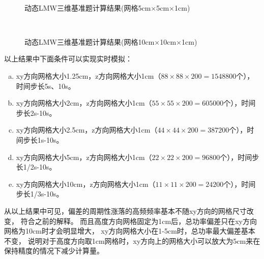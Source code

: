 \begin{figure}[H]
\centering
{}
\\[1cm]
\caption{动态LMW三维基准题计算结果(网格5cm$\times$5cm$\times$1cm)\label{fig:testresult.lwm.5z1}}
\end{figure}


\begin{figure}[H]
\centering
{}
\\[1cm]
\caption{动态LMW三维基准题计算结果(网格10cm$\times$10cm$\times$1cm)\label{fig:testresult.lwm.10z1}}
\end{figure}


\clearpage

以上结果中下面条件可以实现实时模拟：
\begin{enumerate}[a)]
\item xy方向网格大小1.25cm，z方向网格大小1cm（$88\times88\times200=1548800$个），时间步长5s、10s。
\item xy方向网格大小2cm，z方向网格大小1cm（$55\times55\times200=605000$个），时间步长2s-10s。
\item xy方向网格大小2.5cm，z方向网格大小1cm（$44\times44\times200=387200$个），时间步长1s-10s。
\item xy方向网格大小5cm，z方向网格大小1cm（$22\times22\times200=96800$个），时间步长1/2s-10s。
\item xy方向网格大小10cm，z方向网格大小1cm（$11\times11\times200=24200$个），时间步长1/3s-10s。
\end{enumerate}

从以上结果中可见，偏差的周期性涨落的高频频率基本不随xy方向的网格尺寸改变，
符合之前的解释。
而且高度方向网格固定为1cm后，总功率偏差只在xy方向网格为10cm时才会明显增大，
xy方向网格大小在1-5cm时，总功率最大偏差基本不变，
说明对于高度方向取1cm网格时，xy方向上的网格大小可以放大为5cm来在保持精度的情况下减少计算量。